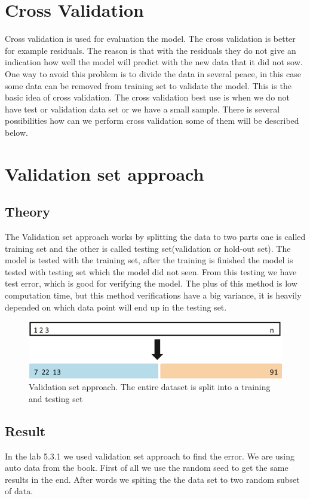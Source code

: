 \section{Cross Validation} \label{ch:crossValidation}
Cross validation is used for evaluation the model. The cross validation is better for example residuals. The reason is that with the residuals they do not give an indication how well the model will predict with the new data that it did not sow. One way to avoid this problem is to divide the data in several peace, in this case some data can be removed from training set to validate the model. This is the basic idea of cross validation. The cross validation best use is when we do not have test or validation data set or we have a small sample. There is several possibilities how can we perform cross validation some of them will be described below.

\section{Validation set approach}
\subsection{Theory}
The Validation set approach works by splitting the data to two parts one is called training set and the other is called testing set(validation or hold-out set). The model is tested with the training set, after the training is finished the model is tested with testing set which the model did not seen. From this testing we have test error, which is good for verifying the model. The plus of this method is low computation time, but this method verifications have a big variance, it is heavily depended on which data point will end up in the testing set.
\begin{figure}
	\centering
	\includegraphics[width=0.4\linewidth]{crossValidation/validationSetApproach}
	\caption{Validation set approach. The entire dataset is split into a training and testing set}
	\label{fig:validationsetapproach}
\end{figure}

\subsection{Result}
In the lab 5.3.1 we used validation set approach to find the error. We are using auto data from the book. First of all we use the random seed to get the same results in the end. After words we spiting the the data set to two random subset of data.

